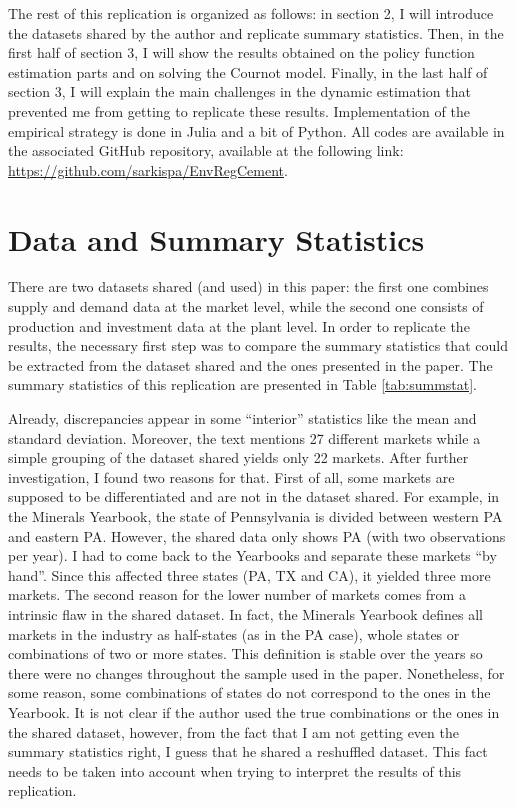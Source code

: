 \documentclass[12pt]{article}
\begin{document}
The rest of this replication is organized as follows: in section 2, I will introduce the datasets shared by the author and replicate summary statistics. Then, in the first half of section 3, I will show the results obtained on the policy function estimation parts and on solving the Cournot model. Finally, in the last half of section 3, I will explain the main challenges in the dynamic estimation that prevented me from getting to replicate these results. Implementation of the empirical strategy is done in Julia and a bit of Python. All codes are available in the associated GitHub repository, available at the following link: \url{https://github.com/sarkispa/EnvRegCement}.

\section{Data and Summary Statistics}

There are two datasets shared (and used) in this paper: the first one combines supply and demand data at the market level, while the second one consists of production and investment data at the plant level. In order to replicate the results, the necessary first step was to compare the summary statistics that could be extracted from the dataset shared and the ones presented in the paper. The summary statistics of this  replication are presented in Table \ref{tab:summstat}.

Already, discrepancies appear in some ``interior'' statistics like the mean and standard deviation. Moreover, the text mentions 27 different markets while a simple grouping of the dataset shared yields only 22 markets. After further investigation, I found two reasons for that. First of all, some markets are supposed to be differentiated and are not in the dataset shared. For example, in the Minerals Yearbook, the state of Pennsylvania is divided between western PA and eastern PA. However, the shared data only shows PA (with two observations per year). I had to come back to the Yearbooks and separate these markets ``by hand''. Since this affected three states (PA, TX and CA), it yielded three more markets. The second reason for the lower number of markets comes from a intrinsic flaw in the shared dataset. In fact, the Minerals Yearbook defines all markets in the industry as half-states (as in the PA case), whole states or combinations of two or more states. This definition is stable over the years so there were no changes throughout the sample used in the paper. Nonetheless, for some reason, some combinations of states do not correspond to the ones in the Yearbook. It is not clear if the author used the true combinations or the ones in the shared dataset, however, from the fact that I am not getting even the summary statistics right, I guess that he shared a reshuffled dataset. This fact needs to be taken into account when trying to interpret the results of this replication.\\
\end{document}
